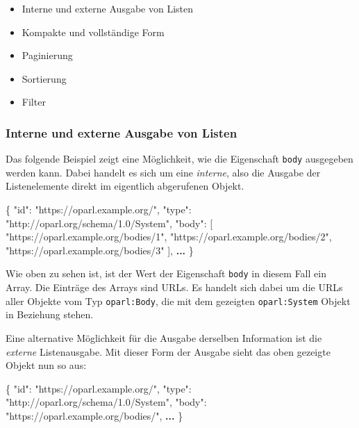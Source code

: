 \documentclass[,a4paper]{article}
\newenvironment{Shaded}{}{}
\newcommand{\DataTypeTok}[1]{\textcolor[rgb]{0.56,0.13,0.00}{{#1}}}
\newcommand{\StringTok}[1]{\textcolor[rgb]{0.25,0.44,0.63}{{#1}}}
\newcommand{\OtherTok}[1]{\textcolor[rgb]{0.00,0.44,0.13}{{#1}}}
\newcommand{\FunctionTok}[1]{\textcolor[rgb]{0.02,0.16,0.49}{{#1}}}
\newcommand{\ErrorTok}[1]{\textcolor[rgb]{1.00,0.00,0.00}{\textbf{{#1}}}}
\begin{document}
\begin{itemize}
\itemsep1pt\parskip0pt
\item
  Interne und externe Ausgabe von Listen
\item
  Kompakte und vollständige Form
\item
  Paginierung
\item
  Sortierung
\item
  Filter
\end{itemize}

\subsubsection{Interne und externe Ausgabe von
Listen}\label{objektlistenux5finternextern}

Das folgende Beispiel zeigt eine Möglichkeit, wie die Eigenschaft
\texttt{body} ausgegeben werden kann. Dabei handelt es sich um eine
\emph{interne}, also die Ausgabe der Listenelemente direkt im eigentlich
abgerufenen Objekt.

\begin{Shaded}
\begin{Highlighting}[]
\FunctionTok{\{}
    \DataTypeTok{"id"}\FunctionTok{:} \StringTok{"https://oparl.example.org/"}\FunctionTok{,}
    \DataTypeTok{"type"}\FunctionTok{:} \StringTok{"http://oparl.org/schema/1.0/System"}\FunctionTok{,}
    \DataTypeTok{"body"}\FunctionTok{:} \OtherTok{[}
        \StringTok{"https://oparl.example.org/bodies/1"}\OtherTok{,}
        \StringTok{"https://oparl.example.org/bodies/2"}\OtherTok{,}
        \StringTok{"https://oparl.example.org/bodies/3"}
    \OtherTok{]}\FunctionTok{,}
    \ErrorTok{...}
\FunctionTok{\}}
\end{Highlighting}
\end{Shaded}

Wie oben zu sehen ist, ist der Wert der Eigenschaft \texttt{body} in
diesem Fall ein Array. Die Einträge des Arrays sind URLs. Es handelt
sich dabei um die URLs aller Objekte vom Typ \texttt{oparl:Body}, die
mit dem gezeigten \texttt{oparl:System} Objekt in Beziehung stehen.

Eine alternative Möglichkeit für die Ausgabe derselben Information ist
die \emph{externe} Listenausgabe. Mit dieser Form der Ausgabe sieht das
oben gezeigte Objekt nun so aus:

\begin{Shaded}
\begin{Highlighting}[]
\FunctionTok{\{}
    \DataTypeTok{"id"}\FunctionTok{:} \StringTok{"https://oparl.example.org/"}\FunctionTok{,}
    \DataTypeTok{"type"}\FunctionTok{:} \StringTok{"http://oparl.org/schema/1.0/System"}\FunctionTok{,}
    \DataTypeTok{"body"}\FunctionTok{:} \StringTok{"https://oparl.example.org/bodies/"}\FunctionTok{,}
    \ErrorTok{...}
\FunctionTok{\}}
\end{Highlighting}
\end{Shaded}
\end{document}
